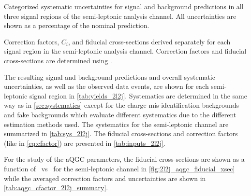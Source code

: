 \begin{table}[ht!]
\centering

\caption{Categorized systematic uncertainties 
for signal and background predictions in all three signal regions
of the semi-leptonic analysis channel.
All uncertainties are shown as a percentage of the nominal
prediction.  }
\label{tab:sys_2l2j}
\end{table}

\begin{table}[ht!]
\centering

\caption{Correction factors, $C_i$, and fiducial cross-sections derived
separately for each signal region in the semi-leptonic analysis channel. 
Correction factors and  fiducial cross-sections are determined
using \madgraph.}
\label{tab:inputs_2l2j}
\end{table}

The resulting signal and background predictions and overall systematic uncertainties,
as well as the observed data events,
are shown for each semi-leptonic signal region in \tab\ref{tab:yields_2l2j}. Systematics
are determined in the same way as in \sec\ref{sec:systematics} except for the charge
mis-identification backgrounds and fake backgrounds which evaluate different systematics due
to the different estimation methods used. The systematics for the semi-leptonic
channel are summarized in \tab\ref{tab:sys_2l2j}. The fiducial cross-sections
and correction factors (like in \eqn\eqref{eq:cfactor}) are presented in \tab\ref{tab:inputs_2l2j}.

For the study of the aQGC parameters, the fiducial cross-sections
are shown as a function of \fszero~vs \fsone~for the semi-leptonic channel in 
\fig\ref{fig:2l2j_aqgc_fiducial_xsec}
while the averaged correction factors and uncertainties are shown in 
\tab\ref{tab:aqgc_cfactor_2l2j_summary}.


